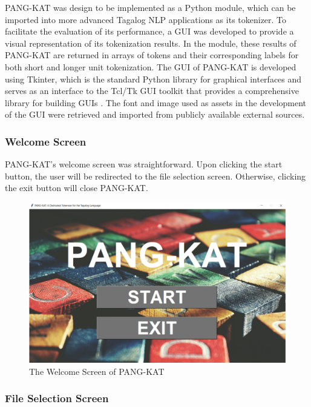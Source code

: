 \documentclass[journal]{./IEEE/IEEEtran}
\begin{document}
PANG-KAT was design to be implemented as a Python module, which can be imported into more advanced Tagalog NLP applications as its tokenizer. To facilitate the evaluation of its performance, a GUI was developed to provide a visual representation of its tokenization results. In the module, these results of PANG-KAT are returned in arrays of tokens and their corresponding labels for both short and longer unit tokenization. The GUI of PANG-KAT is developed using Tkinter, which is the standard Python library for graphical interfaces and serves as an interface to the Tcl/Tk GUI toolkit that provides a comprehensive library for building GUIs {\cite{Python3}}. The font and image used as assets in the development of the GUI were retrieved and imported from publicly available external sources. \\

\subsubsection{Welcome Screen}

PANG-KAT's welcome screen was straightforward. Upon clicking the start button, the user will be redirected to the file selection screen. Otherwise, clicking the exit button will close PANG-KAT.

\begin{figure}[H]
    \centering
    \includegraphics[scale=0.27]{images/Welcome Screen.png}
    \captionsetup{justification=centering}
    \caption{The Welcome Screen of PANG-KAT}
\end{figure}

\subsubsection{File Selection Screen}
\end{document}
